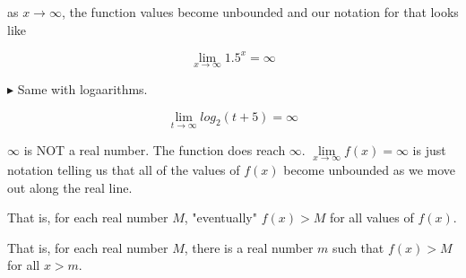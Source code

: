\documentclass{ximera}
\begin{document}
as $x \to \infty$, the function values become unbounded and our notation for that looks like 


\[   \lim\limits_{x \to \infty} 1.5^x   = \infty      \]






$\blacktriangleright$  Same with logaarithms.  

\[   \lim\limits_{t \to \infty} log_2(t+5)   = \infty      \]

\begin{image}
\end{image}





\begin{warning}


$\infty$ is NOT a real number.  The function does reach $\infty$.  $\lim\limits_{x \to \infty} f(x) = \infty$ is just notation telling us that all of the values of $f(x)$ become unbounded as we move out along the real line.  

That is, for each real number $M$, "eventually" $f(x) > M$ for all values of $f(x)$.

That is, for each real number $M$, there is a real number $m$ such that $f(x) > M$ for all $x > m$.


\end{warning}
\end{document}
